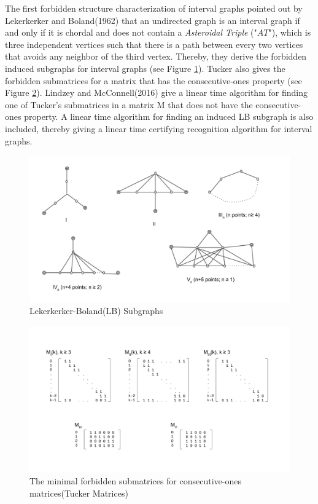 The first forbidden structure characterization of interval graphs  pointed out by Lekerkerker and Boland(1962)\cite{lekkerkerker1962representation} that an undirected graph is an interval graph if and only if it is chordal and does not contain a \emph{Asteroidal Triple} ("$AT$"), which is three independent vertices such that there is a path between every two vertices that avoids any neighbor of the third vertex. Thereby, they derive the forbidden induced subgraphs for interval graphs (see Figure \ref{lb_subgraph}). Tucker\cite{tucker1972structure} also gives the forbidden submatrices for a matrix that has the consecutive-ones property (see Figure \ref{tucker_matrix}). Lindzey and McConnell(2016)\cite{lindzey2016linear} give a linear time algorithm for finding one of Tucker's submatrices in a matrix M that does not have the consecutive-ones property. A linear time algorithm for finding an induced LB subgraph is also included, thereby giving a linear time certifying recognition algorithm for interval graphs.

\begin{figure}[H]
\centering
\includegraphics[width=12cm]{figures/lb_subgraph.pdf}
\caption{Lekerkerker-Boland(LB) Subgraphs}
\label{lb_subgraph}
\end{figure}

\begin{figure}[H]
\centering
\includegraphics[width=16cm]{figures/tucker_matrix.pdf}
\caption{The minimal forbidden submatrices for consecutive-ones matrices(Tucker Matrices)}
\label{tucker_matrix}
\end{figure}












